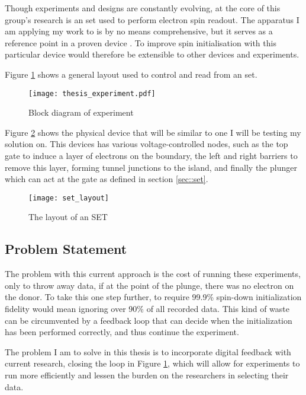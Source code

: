 Though experiments and designs are constantly evolving, at the core of this group's research is an \gls{set} used to perform electron spin readout. The apparatus I am applying my work to is by no means comprehensive, but it serves as a reference point in a proven device \cite{morello2010single}. To improve spin initialisation with this particular device would therefore be extensible to other devices and experiments.

Figure \ref{fig::thesis_experiment} shows a general layout used to control and read from an \gls{set}.

\begin{figure}[htbp!]
	\centering
	\texttt{[image: thesis\_experiment.pdf]}
	\caption{Block diagram of experiment}
	\label{fig::thesis_experiment}
\end{figure}


Figure \ref{fig::set_layout} shows the physical device that will be similar to one I will be testing my solution on. This devices has various voltage-controlled nodes, such as the top gate to induce a layer of electrons on the boundary, the left and right barriers to remove this layer, forming tunnel junctions to the island, and finally the plunger which can act at the gate as defined in section \ref{sec::set}.

\begin{figure}[htbp!]
	\centering
	\texttt{[image: set\_layout]}
	\caption{The layout of an SET}
	\label{fig::set_layout}
\end{figure}

\subsection{Problem Statement}
The problem with this current approach is the cost of running these experiments, only to throw away data, if at the point of the plunge, there was no electron on the donor. To take this one step further, to require 99.9\% spin-down initialization fidelity would mean ignoring over 90\% of all recorded data. This kind of waste can be circumvented by a feedback loop that can decide when the initialization has been performed correctly, and thus continue the experiment.

The problem I am to solve in this thesis is to incorporate digital feedback with current research, closing the loop in Figure \ref{fig::thesis_experiment}, which will allow for experiments to run more efficiently and lessen the burden on the researchers in selecting their data.

